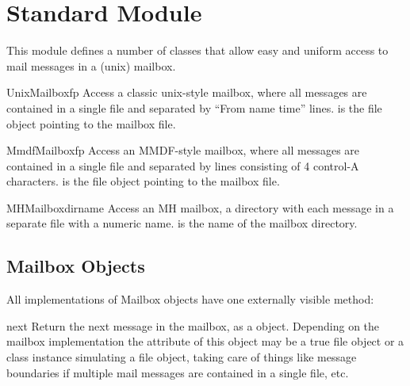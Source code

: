 \section{Standard Module }

\renewcommand{\indexsubitem}{(in module mailbox)}

This module defines a number of classes that allow easy and uniform
access to mail messages in a (unix) mailbox.

\begin{funcdesc}{UnixMailbox}{fp}
Access a classic unix-style mailbox, where all messages are contained
in a single file and separated by ``From name time'' lines. 
is the file object pointing to the mailbox file.
\end{funcdesc}

\begin{funcdesc}{MmdfMailbox}{fp}
Access an MMDF-style mailbox, where all messages are contained
in a single file and separated by lines consisting of 4 control-A
characters. 
is the file object pointing to the mailbox file.
\end{funcdesc}

\begin{funcdesc}{MHMailbox}{dirname}
Access an MH mailbox, a directory with each message in a separate
file with a numeric name. 
is the name of the mailbox directory.
\end{funcdesc}

\subsection{Mailbox Objects}

All implementations of Mailbox objects have one externally visible
method:

\begin{funcdesc}{next}{}
Return the next message in the mailbox, as a  object.
Depending on the mailbox implementation the  attribute of this
object may be a true file object or a class instance simulating a file object,
taking care of things like message boundaries if multiple mail messages are
contained in a single file, etc.
\end{funcdesc}

